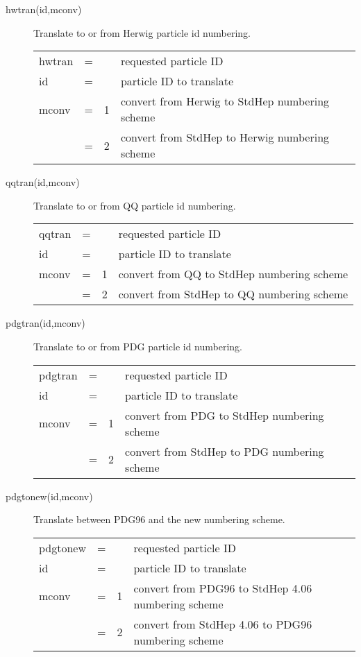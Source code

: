 \begin{description}
\item[hwtran(id,mconv)] Translate to or from Herwig particle id numbering. 

\begin{tabular}{lcll}
hwtran & = &   & requested particle ID \\
id     & = &   & particle ID to translate \\
mconv  & = & 1 & convert from Herwig to StdHep numbering scheme \\
       & = & 2 & convert from StdHep to Herwig numbering scheme \\
\end{tabular}

\item[qqtran(id,mconv)] Translate to or from QQ particle id numbering. 

\begin{tabular}{lcll}
qqtran & = &   & requested particle ID \\
id     & = &   & particle ID to translate \\
mconv  & = & 1 & convert from QQ to StdHep numbering scheme \\
       & = & 2 & convert from StdHep to QQ numbering scheme \\
\end{tabular}

\item[pdgtran(id,mconv)] Translate to or from PDG particle id numbering. 

\begin{tabular}{lcll}
pdgtran & = &   & requested particle ID \\
id      & = &   & particle ID to translate \\
mconv   & = & 1 & convert from PDG to StdHep numbering scheme \\
        & = & 2 & convert from StdHep to PDG numbering scheme \\
\end{tabular}

\item[pdgtonew(id,mconv)] Translate between PDG96 and the new numbering scheme. 

\begin{tabular}{lcll}
pdgtonew & = &   & requested particle ID \\
id       & = &   & particle ID to translate \\
mconv    & = & 1 & convert from PDG96 to StdHep 4.06 numbering scheme \\
         & = & 2 & convert from StdHep 4.06 to PDG96 numbering scheme \\
\end{tabular}


\end{description}
